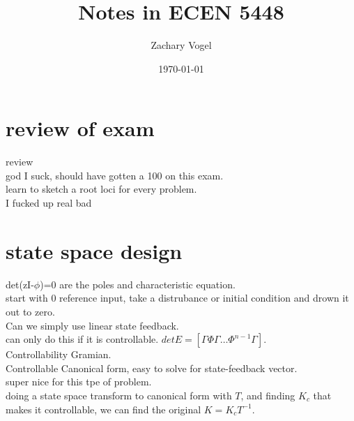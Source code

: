 \documentclass{article}
\author{Zachary Vogel}
\date{\today}
\title{Notes in ECEN 5448}
\begin{document}
\maketitle


\section*{review of exam}
review\\
god I suck, should have gotten a 100 on this exam.\\

learn to sketch a root loci for every problem.\\
I fucked up real bad\\

\section*{state space design}
det(zI-$\phi$)=0 are the poles and characteristic equation.\\

start with 0 reference input, take a distrubance or initial condition and drown it out to zero.\\
Can we simply use linear state feedback.\\

can only do this if it is controllable. $det E=\left [\Gamma \Phi\Gamma \dots \Phi^{n-1}\Gamma\right ]$.\\

Controllability Gramian.\\

Controllable Canonical form, easy to solve for state-feedback vector.\\
super nice for this tpe of problem.\\
doing a state space transform to canonical form with $T$, and finding $K_c$ that makes it controllable, we can find the original $K=K_cT^{-1}$.\\
\end{document}

